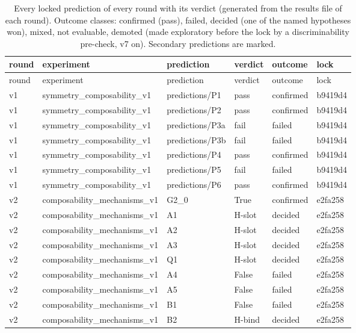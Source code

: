\begin{longtable}{llllll}
\caption{Every locked prediction of every round with its verdict (generated from the results file of each round). Outcome classes: confirmed (pass), failed, decided (one of the named hypotheses won), mixed, not evaluable, demoted (made exploratory before the lock by a discriminability pre-check, v7 on). Secondary predictions are marked.}\label{tab:predictions-all} \\
\toprule round & experiment & prediction & verdict & outcome & lock \\ \midrule \endfirsthead
\toprule round & experiment & prediction & verdict & outcome & lock \\ \midrule \endhead
v1 & symmetry\_composability\_v1 & predictions/P1 & pass & confirmed & b9419d4 \\
v1 & symmetry\_composability\_v1 & predictions/P2 & pass & confirmed & b9419d4 \\
v1 & symmetry\_composability\_v1 & predictions/P3a & fail & failed & b9419d4 \\
v1 & symmetry\_composability\_v1 & predictions/P3b & fail & failed & b9419d4 \\
v1 & symmetry\_composability\_v1 & predictions/P4 & pass & confirmed & b9419d4 \\
v1 & symmetry\_composability\_v1 & predictions/P5 & fail & failed & b9419d4 \\
v1 & symmetry\_composability\_v1 & predictions/P6 & pass & confirmed & b9419d4 \\
v2 & composability\_mechanisms\_v1 & G2\_0 & True & confirmed & e2fa258 \\
v2 & composability\_mechanisms\_v1 & A1 & H-slot & decided & e2fa258 \\
v2 & composability\_mechanisms\_v1 & A2 & H-slot & decided & e2fa258 \\
v2 & composability\_mechanisms\_v1 & A3 & H-slot & decided & e2fa258 \\
v2 & composability\_mechanisms\_v1 & Q1 & H-slot & decided & e2fa258 \\
v2 & composability\_mechanisms\_v1 & A4 & False & failed & e2fa258 \\
v2 & composability\_mechanisms\_v1 & A5 & False & failed & e2fa258 \\
v2 & composability\_mechanisms\_v1 & B1 & False & failed & e2fa258 \\
v2 & composability\_mechanisms\_v1 & B2 & H-bind & decided & e2fa258 \\

\end{longtable}
